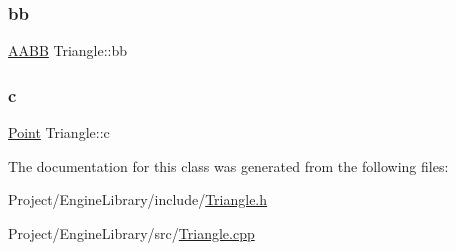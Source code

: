 \subsubsection{\texorpdfstring{bb}{bb}}
{\footnotesize\ttfamily \mbox{\hyperlink{class_a_a_b_b}{A\+A\+BB}} Triangle\+::bb}

\mbox{\label{class_triangle_a972f16cb46805d72e9421b3c42ebc980}} 
\subsubsection{\texorpdfstring{c}{c}}
{\footnotesize\ttfamily \mbox{\hyperlink{class_point}{Point}} Triangle\+::c}



The documentation for this class was generated from the following files\+:\begin{DoxyCompactItemize}
\item 
Project/\+Engine\+Library/include/\mbox{\hyperlink{_triangle_8h}{Triangle.\+h}}\item 
Project/\+Engine\+Library/src/\mbox{\hyperlink{_triangle_8cpp}{Triangle.\+cpp}}\end{DoxyCompactItemize}
